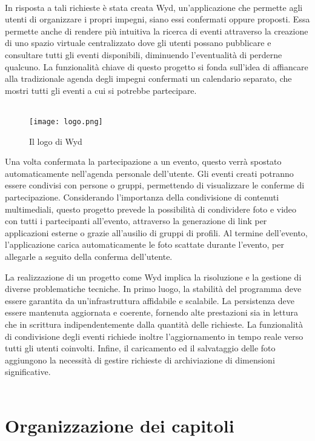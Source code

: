 \\
In risposta a tali richieste è stata creata Wyd, 
un'applicazione che permette agli utenti di organizzare i propri impegni, 
siano essi confermati oppure proposti. 
Essa permette anche di rendere più intuitiva la ricerca di eventi 
attraverso la creazione di uno spazio virtuale centralizzato 
dove gli utenti possano pubblicare e consultare tutti gli eventi disponibili,
diminuendo l’eventualità di perderne qualcuno.
La funzionalità chiave di questo progetto si fonda sull'idea di affiancare alla tradizionale agenda degli impegni confermati un calendario separato, 
che mostri tutti gli eventi a cui si potrebbe partecipare. \\
\\
\begin{wrapfigure}{r}{0.4\textwidth}
    \centering
    \texttt{[image: logo.png]}
    \caption{Il logo di Wyd}
\end{wrapfigure}	
Una volta confermata la partecipazione a un evento, 
questo verrà spostato automaticamente nell'agenda personale dell'utente.
Gli eventi creati potranno essere condivisi con persone o gruppi, 
permettendo di visualizzare le conferme di partecipazione. 
Considerando l'importanza della condivisione di contenuti multimediali, 
questo progetto prevede la possibilità di condividere foto e video con tutti i partecipanti all'evento, 
attraverso la generazione di link per applicazioni esterne o grazie all'ausilio di gruppi di profili. 
Al termine dell’evento, l'applicazione carica automaticamente le foto scattate durante l'evento,
per allegarle a seguito della conferma dell'utente.



\clearpage
La realizzazione di un progetto come Wyd implica la risoluzione e 
la gestione di diverse problematiche tecniche. 
In primo luogo, la stabilità del programma deve essere garantita 
da un'infrastruttura affidabile e scalabile. 
La persistenza deve essere mantenuta aggiornata e coerente, 
fornendo alte prestazioni sia in lettura che in scrittura indipendentemente dalla quantità delle richieste.
La funzionalità di condivisione degli eventi richiede inoltre l'aggiornamento in tempo reale verso tutti gli utenti coinvolti.
Infine, il caricamento ed il salvataggio delle foto aggiungono la necessità di gestire richieste di archiviazione di dimensioni significative.\\
\\
\section*{Organizzazione dei capitoli}

